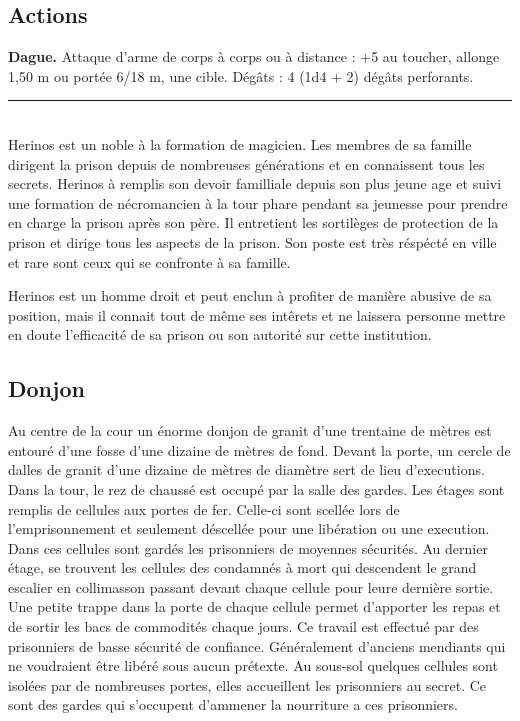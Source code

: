 \begin{figure*}[tb!]
{\begin{minipage}[c]{.45\linewidth}
    \subsection*{Actions}
    {\bfseries Dague.} Attaque d'arme de corps à corps ou à distance : +5 au toucher, allonge 1,50 m ou portée 6/18 m,
         une cible. Dégâts : 4 (1d4 + 2) dégâts perforants. \\
   \noindent\rule{\textwidth}{1pt} \\
Herinos est un noble à la formation de magicien. Les membres de sa famille
dirigent la prison depuis de nombreuses générations et en connaissent tous les 
secrets. Herinos à remplis son devoir familliale depuis son plus jeune age et
suivi une formation de nécromancien à la tour phare pendant sa jeunesse pour 
prendre en charge la prison après son père. Il entretient les sortilèges de 
protection de la prison et dirige tous les aspects de la prison. Son poste est 
très réspécté en ville et rare sont ceux qui se confronte à sa famille. 

Herinos est un homme droit et peut enclun à profiter de manière abusive de
sa position, mais il connait tout de même ses intêrets et ne laissera personne
mettre en doute l'efficacité de sa prison ou son autorité sur cette institution.
 \end{minipage}
}%
\end{figure*}

\subsection{Donjon}

Au centre de la cour un énorme donjon de granit d'une trentaine de
mètres est entouré d'une fosse
d'une dizaine de mètres de fond. Devant la porte, un 
cercle de dalles de granit d'une dizaine de mètres de diamètre sert de lieu 
d'executions. Dans la tour,
le rez de chaussé est occupé par la salle des gardes. Les étages sont 
remplis de cellules aux portes de fer. Celle-ci sont scellée lors de 
l'emprisonnement et seulement déscellée pour une libération ou une 
execution. Dans ces cellules sont gardés les prisonniers de moyennes 
sécurités. Au dernier étage, se trouvent les cellules des 
condamnés à mort qui descendent le grand escalier en collimasson passant
devant chaque cellule pour leure dernière sortie. Une petite trappe dans 
la porte de chaque cellule permet d'apporter 
les repas et de sortir les bacs de commodités chaque jours. Ce travail est effectué par 
des prisonniers de basse sécurité de confiance. Généralement d'anciens 
mendiants qui ne voudraient être libéré sous aucun prétexte. Au sous-sol quelques cellules sont 
isolées par de nombreuses portes, elles accueillent les prisonniers 
au secret. Ce sont des gardes qui s'occupent d'ammener la nourriture a ces 
prisonniers.

